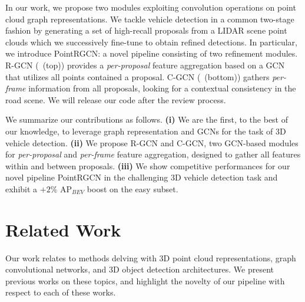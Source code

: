 \documentclass[10pt,twocolumn,letterpaper]{article}
\begin{document}
In our work, we propose two modules exploiting convolution operations on point cloud graph representations.
We tackle vehicle detection in a common two-stage fashion by generating a set of high-recall proposals from a LIDAR scene point clouds which we successively fine-tune to obtain refined detections.
In particular, we introduce PointRGCN: a novel pipeline consisting of two refinement modules.
R-GCN (~(top)) provides a \emph{per-proposal} feature aggregation based on a GCN that utilizes all points contained a proposal. 
C-GCN (~(bottom)) gathers \emph{per-frame} information from all proposals, looking for a contextual consistency in the road scene.
We will release our code after the review process.




 We summarize our contributions as follows.
\textbf{(i)}
We are the first, to the best of our knowledge, to leverage graph representation and GCNs for the task of 3D vehicle detection.
\textbf{(ii)} 
We propose R-GCN and C-GCN, two GCN-based modules for \emph{per-proposal} and \emph{per-frame} feature aggregation, designed to gather all features within and between proposals.
\textbf{(iii)} 
We show competitive performances for our novel pipeline PointRGCN in the challenging \KITTI 3D vehicle detection task and exhibit a $+2\%$ AP$_{BEV}$ boost on the easy subset.



 \section{Related Work}

Our work relates to methods delving with 3D point cloud representations, graph convolutional networks, and 3D object detection architectures.
We present previous works on these topics, and highlight the novelty of our pipeline with respect to each of these works.
\end{document}
